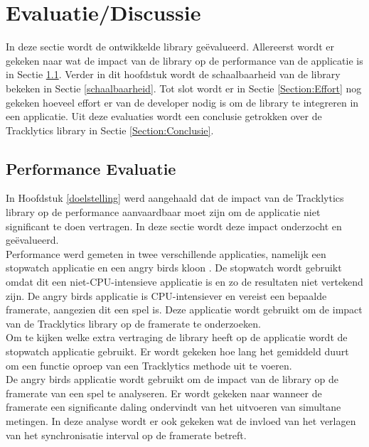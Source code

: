 \chapter{Evaluatie/Discussie} \label{evaluatie}
In deze sectie wordt de ontwikkelde library ge\"evalueerd. Allereerst wordt er gekeken naar wat de impact van de library op de performance van de applicatie is in Sectie \ref{performance}. Verder in dit hoofdstuk wordt de schaalbaarheid van de library bekeken in Sectie \ref{schaalbaarheid}. Tot slot wordt er in Sectie \ref{Section:Effort} nog gekeken hoeveel effort er van de developer nodig is om de library te integreren in een applicatie. Uit deze evaluaties wordt een conclusie getrokken over de Tracklytics library in Sectie \ref{Section:Conclusie}.


\section{Performance Evaluatie} \label{performance}
In Hoofdstuk \ref{doelstelling} werd aangehaald dat de impact van de Tracklytics library op de performance aanvaardbaar moet zijn om de applicatie niet significant te doen vertragen. In deze sectie wordt deze impact onderzocht en ge\"evalueerd. \\

Performance werd gemeten in twee verschillende applicaties, namelijk een stopwatch applicatie en een angry birds kloon \cite{AngryBirds}. De stopwatch wordt gebruikt omdat dit een niet-CPU-intensieve applicatie is en zo de resultaten niet vertekend zijn. De angry birds applicatie is CPU-intensiever en vereist een bepaalde framerate, aangezien dit een spel is. Deze applicatie wordt gebruikt  om de impact van de Tracklytics library op de framerate te onderzoeken. \\

Om te kijken welke extra vertraging de library heeft op de applicatie wordt de stopwatch applicatie gebruikt. Er wordt gekeken hoe lang het gemiddeld duurt om een functie oproep van een Tracklytics methode uit te voeren.\\

De angry birds applicatie wordt gebruikt om de impact van de library op de framerate van een spel te analyseren. Er wordt gekeken naar wanneer de framerate een significante daling ondervindt van het uitvoeren van simultane metingen. In deze analyse wordt er ook gekeken wat de invloed van het verlagen van het synchronisatie interval op de framerate betreft.\\

